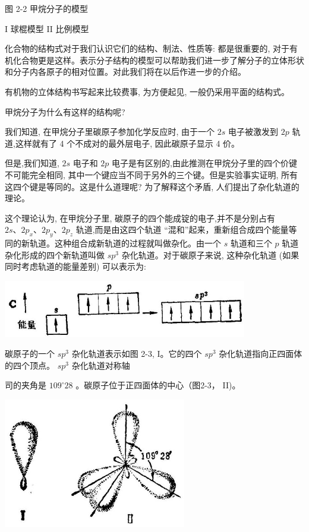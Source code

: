 \documentclass[10pt]{article}
\begin{document}
图 2-2 甲烷分子的模型

I 球棍模型 II 比例模型

化合物的结构式对于我们认识它们的结构、制法、性质等: 都是很重要的, 对于有机化合物更是这样。表示分子结构的模型可以帮助我们进一步了解分子的立体形状和分子内各原子的相对位置。对此我们将在以后作进一步的介绍。

有机物的立体结构书写起来比较费事, 为方便起见, 一般仍采用平面的结构式。

甲烷分子为什么有这样的结构呢?

我们知道, 在甲烷分子里碳原子参加化学反应时, 由于一个 \({2s}\) 电子被激发到 \({2p}\) 轨道,这样就有了 4 个不成对的最外层电子, 因此碳原子显示 4 价。

但是,我们知道, \({2s}\) 电子和 \({2p}\) 电子是有区别的,由此推测在甲烷分子里的四个价键不可能完全相同, 其中一个键应当不同于另外的三个键。但是实验事实证明, 所有这四个键是等同的。这是什么道理呢? 为了解释这个矛盾, 人们提出了杂化轨道的理论。

这个理论认为, 在甲烷分子里, 碳原子的四个能成锭的电子,并不是分别占有 \({2s}\text{、}2{p}_{x}\text{、}2{p}_{y}\text{、}2{p}_{z}\) 轨道,而是由这四个轨道 “混和”起来，重新组合成四个能量等同的新轨道。这种组合成新轨道的过程就叫做杂化。由一个 \(s\) 轨道和三个 \(p\) 轨道杂化形成的四个新轨道叫做 \(s{p}^{3}\) 杂化轨道。对于碳原子来说, 这种杂化轨道 (如果同时考虑轨道的能量差别) 可以表示为:

\begin{center}
\includegraphics[max width=0.8\textwidth]{images/01912d16-be99-77bb-9535-4f3ed8d9946f_53_979818.jpg}
\end{center}

碳原子的一个 \(s{p}^{3}\) 杂化轨道表示如图 2-3, I。它的四个 \(s{p}^{3}\) 杂化轨道指向正四面体的四个顶点。 \(s{p}^{3}\) 杂化轨道对称轴

司的夹角是 \({109}^{ \circ }{28}\) 。碳原子位于正四面体的中心（图2-3， II)。

\begin{center}
\includegraphics[max width=0.6\textwidth]{images/01912d16-be99-77bb-9535-4f3ed8d9946f_54_283826.jpg}
\end{center}
\end{document}
